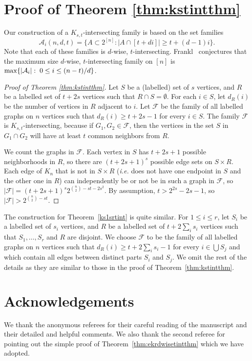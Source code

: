 \documentclass[12pt]{article}
\theoremstyle{definition}
\newcommand{\cA}{\mathcal{A}}
\newcommand{\cF}{\mathcal{F}}
\begin{document}
\section{Proof of Theorem \ref{thm:kstintthm}}

Our construction of a $K_{s, t}$-intersecting family is based on the set families 
\[\cA_i(n, d, t) = \{A \subset 2^{[n]}: |A\cap [t+di]| \ge  t+(d-1)i\}.\]
Note that each of these families is $d$-wise, $t$-intersecting. Frankl~\cite{F2} conjectures that the maximum size $d$-wise, $t$-intersecting family on $[n]$ is $\max\{|\cA_i|:\hspace{1mm} 0 \le i \le (n-t)/d\}$. 

\begin{proof}[Proof of Theorem \ref{thm:kstintthm}]
Let $S$ be a (labelled) set of $s$ vertices, and $R$ be a labelled set of $t+2s$ vertices such that $R\cap S = \emptyset$. For each $i \in S$, let $d_R(i)$ be the number of vertices in $R$ adjacent to $i$. Let $\cF$  be the family of all labelled graphs on $n$ vertices such that $d_R(i) \ge t+2s-1$ for every $i \in S$. The family $\cF$ is $K_{s, t}$-intersecting, because if $G_1, G_2 \in \cF$, then the vertices in the  set $S$ in $G_1 \cap G_2$ will have at least $t$ common neighbors from $R$. 

We count the graphs in $\cF$. Each vertex in $S$ has $t+2s+1$ possible neighborhoods in $R$, so there are $(t+2s+1)^s$ possible edge sets on $S\times R$. Each edge of $K_n$ that is not in $S\times R$ (\textit{i.e.} does not have one endpoint in $S$ and the other one in $R$) can independently be or not be in such a graph in $\cF$, so $|\cF| = (t+2s+1)^s2^{\binom{n}{2}-st - 2s^2}$. By assumption, $t > 2^{2s}-2s-1$, so $|\cF| > 2^{\binom{n}{2} - st}$.
\end{proof}

The construction for Theorem~\ref{ks1srtint} is quite similar. For $1\le i\le r$, let $S_i$ be a labelled set of $s_i$ vertices, and $R$ be a labelled set of $t+2\sum_{i}s_i$ vertices such that $S_1, \ldots, S_r$ and $R$ are disjoint. We choose $\cF$ to be the family of all labelled graphs on $n$ vertices such that $d_R(i) \ge t+2\sum_{i}s_i-1$ for every $i \in \bigcup S_j$ and which contain all edges between distinct parts $S_i$ and $S_j$. We omit the rest of the details as they are similar to those in the proof of Theorem~\ref{thm:kstintthm}. 


\section*{Acknowledgements}
We thank the anonymous referees for their careful reading of the manuscript and their detailed and helpful comments. We also thank the second referee for pointing out the simple proof of Theorem~\ref{thm:ekrdwisetintthm} which we have adopted. 
\end{document}
